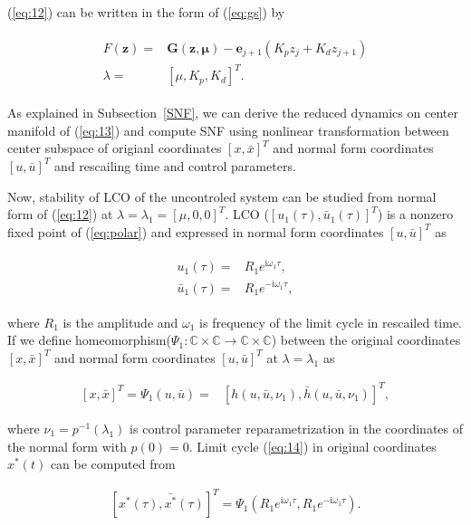 \documentclass[openacc]{rsproca_new}%
\def\complex{\mathbb{C}}
\def\vec#1{\ensuremath{\mathbf{#1}}}
\newcommand{\Eref}[1]{(\ref{#1})}
\newcommand{\Ssref}[1]{Subsection~\ref{#1}}
\begin{document}
\noindent \Eref{eq:12} can be written in the form of \Eref{eq:gs} by

\begin{align}\label{eq:13}
\begin{split}
  F({\vec{z}})=&\vec{G}(\vec{z},\vec{\mu})-\vec{e}_{j+1}(K_pz_j+K_d z_{j+1})\\
  \lambda=&[\mu,K_p,K_d]^T.
\end{split}
\end{align}

\noindent As explained in \Ssref{SNF}, we can derive the reduced dynamics on center manifold of \Eref{eq:13} and compute SNF using nonlinear transformation between center subspace of origianl coordinates $[x,\bar x]^T$ and normal form coordinates $[u,\bar u]^T$ and rescailing time and control parameters.

Now, stability of LCO of the uncontroled system can be studied from normal form of \Eref{eq:12} at $\lambda=\lambda_1=[\mu,0,0]^T$. LCO ($[u_1(\tau),\bar u_1(\tau)]^T$) is a nonzero fixed point of \Eref{eq:polar} and expressed in normal form coordinates $[u,\bar u]^T$ as

\begin{align}\label{eq:14}
  \begin{split}
      u_1(\tau)=&R_1e^{\textrm{i}\omega_1 \tau},\\
      \bar u_1(\tau)=&R_1e^{-\textrm{i}\omega_1 \tau},
    \end{split}
\end{align}

\noindent where $R_1$ is the amplitude and $\omega_1$ is frequency of the limit cycle in rescailed time. If we define homeomorphism($\Psi_1:\complex\times\complex\rightarrow\complex\times\complex$) between the original coordinates $[x,\bar x]^T$ and normal form coordinates $[u,\bar u]^T$ at $\lambda=\lambda_1$ as

\begin{align}\label{eq:15}
    [x,\bar x]^T=\Psi_1(u,\bar u)=&[h(u,\bar u,\nu_1),\bar h(u,\bar u,\nu_1)]^T,
\end{align}

\noindent  where $\nu_1=p^{-1}(\lambda_1)$ is control parameter reparametrization in the coordinates of the normal form with $p(0)=0$. Limit cycle \Eref{eq:14} in original coordinates $x^*(t)$ can be computed from

\begin{align}\label{eq:16}
    [x^*(\tau),\bar {x^*}(\tau)]^T=\Psi_1(R_1e^{\textrm{i}\omega_1 \tau},R_1e^{-\textrm{i}\omega_1 \tau}).
\end{align}
\end{document}
